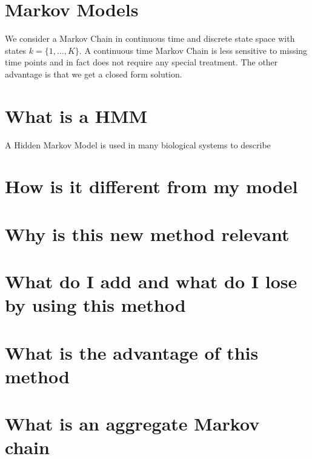 \documentclass[11pt,fleqn]{article}
\begin{document}
\section{Markov Models}

We consider a Markov Chain in continuous time and discrete state space with states $k=\{1, \ldots, K\}$. A continuous time Markov Chain is less sensitive to missing time points and in fact does not require any special treatment. The other advantage is that we get a closed form solution.

\section{What is a HMM}

A Hidden Markov Model is used in many biological systems to describe  

\section{How is it different from my model}

\section{Why is this new method relevant}

\section{What do I add and what do I lose by using this method}

\section{What is the advantage of this method}

\section{What is an aggregate Markov chain}
\end{document}
